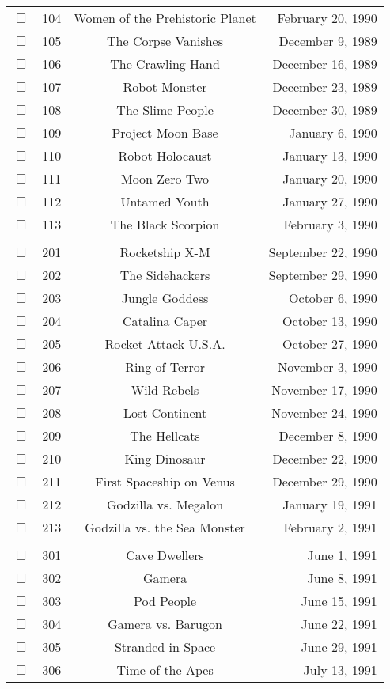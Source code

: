 \documentclass[12pt]{article}
\begin{document}
\begin{center}
\begin{longtable}[c]{cccr}
$\Box$&104&Women of the Prehistoric Planet&February 20, 1990\\
$\Box$&105&The Corpse Vanishes&December  9, 1989\\
$\Box$&106&The Crawling Hand&December 16, 1989\\
$\Box$&107&Robot Monster&December 23, 1989\\
$\Box$&108&The Slime People&December 30, 1989\\
$\Box$&109&Project Moon Base&January  6, 1990\\
$\Box$&110&Robot Holocaust&January 13, 1990\\
$\Box$&111&Moon Zero Two&January 20, 1990\\
$\Box$&112&Untamed Youth&January 27, 1990\\
$\Box$&113&The Black Scorpion&February  3, 1990\\
\\
$\Box$&201&Rocketship X-M&September 22, 1990\\
$\Box$&202&The Sidehackers&September 29, 1990\\
$\Box$&203&Jungle Goddess&October  6, 1990\\
$\Box$&204&Catalina Caper&October 13, 1990\\
$\Box$&205&Rocket Attack U.S.A.&October 27, 1990\\
$\Box$&206&Ring of Terror&November  3, 1990\\
$\Box$&207&Wild Rebels&November 17, 1990\\
$\Box$&208&Lost Continent&November 24, 1990\\
$\Box$&209&The Hellcats&December  8, 1990\\
$\Box$&210&King Dinosaur&December 22, 1990\\
$\Box$&211&First Spaceship on Venus&December 29, 1990\\
$\Box$&212&Godzilla vs. Megalon&January 19, 1991\\
$\Box$&213&Godzilla vs. the Sea Monster&February  2, 1991\\
\\
$\Box$&301&Cave Dwellers&June  1, 1991\\
$\Box$&302&Gamera&June  8, 1991\\
$\Box$&303&Pod People&June 15, 1991\\
$\Box$&304&Gamera vs. Barugon&June 22, 1991\\
$\Box$&305&Stranded in Space&June 29, 1991\\
$\Box$&306&Time of the Apes&July 13, 1991\\

\end{longtable}
\end{center}
\end{document}
